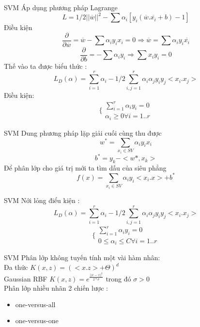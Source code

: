 \documentclass[compress]{beamer}
\begin{document}
\begin{frame}{SVM}
Áp dụng phương pháp Lagrange  
$$ L= 1/2 ||\overline{w}||^2 -\sum\alpha_i[y_i(\overline{w}.\overline{x_i} +b)-1] $$
Điều kiện 
$$ \frac{ \partial}{\partial\overline{w}}
=\overline{w}- \sum \alpha_i y_i x_i=0 \Longrightarrow \overline{w}=\sum \alpha_i y_i \overline{x_i} $$
$$\frac{ \partial}{\partial b}=-\sum \alpha_i y_i \Longrightarrow \sum x_i y_i=0$$ 
Thế vào ta được biểu thức :
$$L_D(\alpha)=\sum_{i=1}^r \alpha_i-1/2 \sum_{i,j=1}^{r}\alpha_i \alpha_j y_i y_j<x_i.x_j> $$
Điều kiện:
$$\{ \begin{array}{l}
\sum_{i=1 } ^{r} \alpha_i y_i =0 \\
\alpha_i \geq 0 \forall i=1..r
\end{array}
$$
\end{frame}
\begin{frame}{SVM}
Dung phương pháp lặp giải cuối cùng thu được
$$w^* =\sum_{x_i \in SV} \alpha_i y_i x_i  $$
$$b^*=y_k-<w*,x_k>$$
Để phân lớp cho giá trị mới ta tìm dấu của siêu phẳng $$ f(x)=\sum_{x_i \in SV} \alpha_i y_i <x_i .x>+b^*$$
\end{frame}
\begin{frame}{SVM}
Nới lỏng điểu kiện :
$$L_D(\alpha)=\sum_{i=1}^r \alpha_i-1/2 \sum_{i,j=1}^{r}\alpha_i \alpha_j y_i y_j<x_i.x_j> $$
$$
\{ \begin{array}{l}
\sum_{i=1 } ^{r} \alpha_i y_i =0 \\
0 \leq \alpha_i \leq C \forall i=1..r
\end{array}
$$
\end{frame}
\begin{frame}{SVM}
Phân lớp không tuyến tính một vài hàm nhân:\\
Đa thức $K(x,z)=(<x.z>+\Theta)^d $\\
Gaussian RBF $K(x,z)=e^{\frac{||x-z||^2}{2*\sigma}}$ trong đó $\sigma >0$\\
Phân lớp nhiều nhãn 2 chiến lược :
\begin{itemize}
\item one-versus-all
\item one-versus-one 
\end{itemize}
\end{frame}
\end{document}
